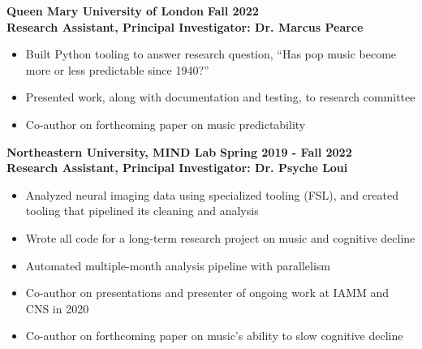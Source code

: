 \documentclass[12pt]{article}
\begin{document}
\textbf{Queen Mary University of London} \hfill \textbf{Fall 2022} \\
\textbf{Research Assistant, Principal Investigator: Dr. Marcus Pearce}
\begin{itemize}
    \itemsep=-0.3em
    \item Built Python tooling to answer research question, “Has pop music become more or less predictable since 1940?” 
    \item Presented work, along with documentation and testing, to research committee
    \item Co-author on forthcoming paper on music predictability 
\end{itemize}
\textbf{Northeastern University, MIND Lab} \hfill \textbf{Spring 2019 - Fall 2022} \\
\textbf{Research Assistant, Principal Investigator:  Dr. Psyche Loui}
\begin{itemize}
    \itemsep=-0.3em
    \item Analyzed neural imaging data using specialized tooling (FSL), and created tooling that pipelined its cleaning and analysis
    \item Wrote all code for a long-term research project on music and cognitive decline
    \item Automated multiple-month analysis pipeline with parallelism
    \item Co-author on presentations and presenter of ongoing work at IAMM and CNS in 2020
    \item Co-author on forthcoming paper on music's ability to slow cognitive decline
\end{itemize}

\end{document}
